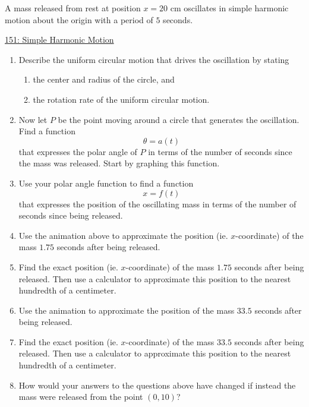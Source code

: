 \documentclass{ximera}
\begin{document}
\begin{example} \label{ExODferre3}
A mass released from rest at position $x=20$ cm oscillates in simple harmonic motion about the origin with a period of $5$ seconds.

\begin{onlineOnly}
    \begin{center}
\end{center}
\end{onlineOnly}

\href{https://www.desmos.com/calculator/dcba538898}{151: Simple Harmonic Motion}

\begin{enumerate}

\item Describe the uniform circular motion that drives the oscillation by stating
\begin{enumerate}
\item the center and radius of the circle, and

\item the rotation rate of the uniform circular motion. 
\end{enumerate}


\item Now let $P$ be the point moving around a circle that generates the oscillation. Find a function
\[
    \theta = a(t)
\]
that expresses the polar angle of $P$ in terms of the number of seconds since the mass was released. Start by graphing this function. 

\item Use your polar angle function to find a function 
\[
   x= f(t)
\]
that expresses the position of the oscillating mass in terms of the number of seconds since being released.

\item Use the animation above to approximate  the position (ie. $x$-coordinate) of the mass $1.75$ seconds after being released.

\item Find the exact position (ie. $x$-coordinate) of the mass $1.75$ seconds after being released. Then use a calculator to approximate this position to the nearest hundredth of a centimeter.

\item Use the animation to approximate the position of the mass $33.5$ seconds after being released. 

\item Find the exact position (ie. $x$-coordinate) of the mass $33.5$ seconds after being released. Then use a calculator to approximate this position to the nearest hundredth of a centimeter.

\item How would your answers to the questions above have changed if instead the mass were released from the point $(0,10)$?

\end{enumerate}

\end{example}
\end{document}
